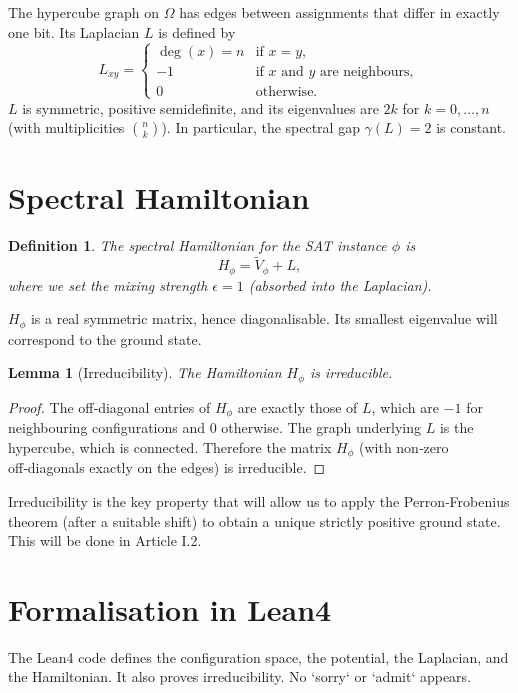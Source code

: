 \documentclass[11pt,a4paper]{article}
\newtheorem{lemma}[theorem]{Lemma}
\newtheorem{definition}[theorem]{Definition}
\begin{document}
The hypercube graph on $\Omega$ has edges between assignments that differ in exactly one bit. Its Laplacian $L$ is defined by
\[
L_{xy} = \begin{cases}
\deg(x) = n & \text{if } x=y,\\
-1 & \text{if } x \text{ and } y \text{ are neighbours},\\
0 & \text{otherwise}.
\end{cases}
\]
$L$ is symmetric, positive semidefinite, and its eigenvalues are $2k$ for $k=0,\dots,n$ (with multiplicities $\binom{n}{k}$). In particular, the spectral gap $\gamma(L) = 2$ is constant.

\section{Spectral Hamiltonian}

\begin{definition}
The spectral Hamiltonian for the SAT instance $\phi$ is
\[
H_\phi = \tilde{V}_\phi + L,
\]
where we set the mixing strength $\epsilon = 1$ (absorbed into the Laplacian).
\end{definition}

$H_\phi$ is a real symmetric matrix, hence diagonalisable. Its smallest eigenvalue will correspond to the ground state.

\begin{lemma}[Irreducibility]
The Hamiltonian $H_\phi$ is irreducible.
\end{lemma}
\begin{proof}
The off‑diagonal entries of $H_\phi$ are exactly those of $L$, which are $-1$ for neighbouring configurations and $0$ otherwise. The graph underlying $L$ is the hypercube, which is connected. Therefore the matrix $H_\phi$ (with non‑zero off‑diagonals exactly on the edges) is irreducible.
\end{proof}

Irreducibility is the key property that will allow us to apply the Perron‑Frobenius theorem (after a suitable shift) to obtain a unique strictly positive ground state. This will be done in Article I.2.

\section{Formalisation in Lean4}

The Lean4 code defines the configuration space, the potential, the Laplacian, and the Hamiltonian. It also proves irreducibility. No `sorry` or `admit` appears.
\end{document}
